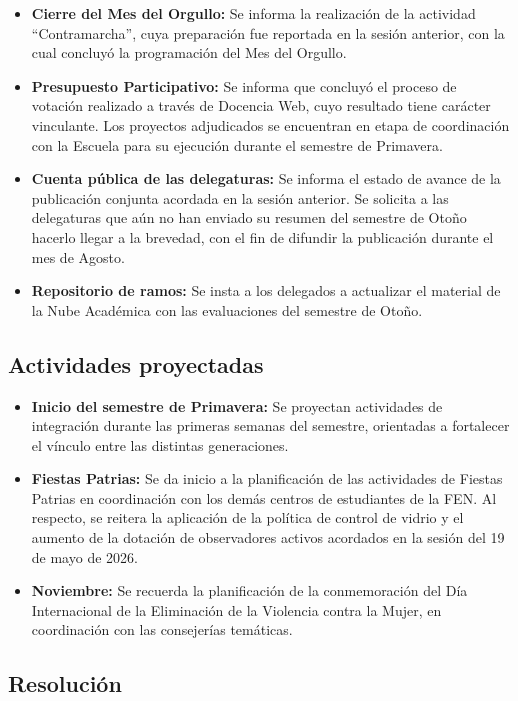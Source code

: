 \documentclass[12pt,letterpaper]{article}
\newif\ifrevision
\newcommand{\dato}[1]{\ifrevision\textcolor[HTML]{C0392B}{#1}\else#1\fi}
\begin{document}
\begin{itemize}
  \item \textbf{Cierre del Mes del Orgullo:} \dato{Se informa la realización de la actividad ``Contramarcha'', cuya preparación fue reportada en la sesión anterior, con la cual concluyó la programación del Mes del Orgullo.}
  \item \textbf{Presupuesto Participativo:} Se informa que concluyó el proceso de votación realizado a través de Docencia Web, cuyo resultado tiene carácter vinculante. Los proyectos adjudicados se encuentran en etapa de coordinación con la Escuela para su ejecución durante el semestre de Primavera.
  \item \textbf{Cuenta pública de las delegaturas:} Se informa el estado de avance de la publicación conjunta acordada en la sesión anterior. Se solicita a las delegaturas que aún no han enviado su resumen del semestre de Otoño hacerlo llegar a la brevedad, con el fin de difundir la publicación durante el mes de Agosto.
  \item \textbf{Repositorio de ramos:} Se insta a los delegados a actualizar el material de la Nube Académica con las evaluaciones del semestre de Otoño.
\end{itemize}

\subsection{Actividades proyectadas}

\begin{itemize}
  \item \textbf{Inicio del semestre de Primavera:} Se proyectan actividades de integración durante las primeras semanas del semestre, orientadas a fortalecer el vínculo entre las distintas generaciones.
  \item \textbf{Fiestas Patrias:} Se da inicio a la planificación de las actividades de Fiestas Patrias en coordinación con los demás centros de estudiantes de la FEN. Al respecto, se reitera la aplicación de la política de control de vidrio y el aumento de la dotación de observadores activos acordados en la sesión del 19 de mayo de 2026.
  \item \textbf{Noviembre:} Se recuerda la planificación de la conmemoración del Día Internacional de la Eliminación de la Violencia contra la Mujer, en coordinación con las consejerías temáticas.
\end{itemize}

\subsection{Resolución}
\end{document}
